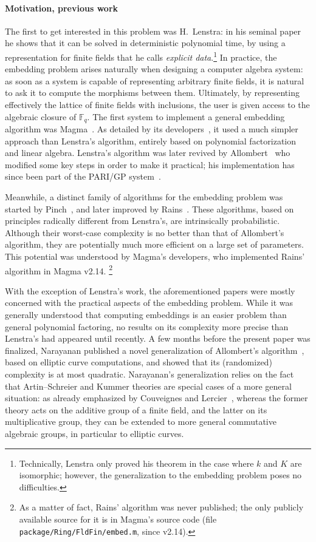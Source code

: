 \documentclass[12pt]{article}
\theoremstyle{plain}
\theoremstyle{definition}
\def\F{\ensuremath{\mathbb{F}}}
\newcounter{algorithm}
\begin{document}
\paragraph{Motivation, previous work}
The first to get interested in this problem was H.~Lenstra: in his
seminal paper~\cite{LenstraJr91} he shows that it can be solved in
deterministic polynomial time, by using a representation for finite
fields that he calls \emph{explicit data}.\footnote{Technically,
  Lenstra only proved his theorem in the case where $k$ and $K$ are
  isomorphic; however, the generalization to the embedding problem
  poses no difficulties.} %
In practice, the embedding problem arises naturally when designing a
computer algebra system: as soon as a system is capable of
representing arbitrary finite fields, it is natural to ask it to
compute the morphisms between them. %
Ultimately, by representing effectively the lattice of finite fields
with inclusions, the user is given access to the algebraic closure of
$\F_q$. %
The first system to implement a general embedding algorithm was
Magma~\cite{MAGMA}. %
As detailed by its developers~\cite{bosma+cannon+steel97}, it used a
much simpler approach than Lenstra's algorithm, entirely based on
polynomial factorization and linear algebra. %
Lenstra's algorithm was later revived by
Allombert~\cite{Allombert02,Allombert02-rev} who modified some key
steps in order to make it practical; his implementation has since been
part of the PARI/GP system~\cite{Pari}.

Meanwhile, a distinct family of algorithms for the embedding problem
was started by Pinch~\cite{Pinch}, and later improved by
Rains~\cite{rains2008}. %
These algorithms, based on principles radically different from
Lenstra's, are intrinsically probabilistic. %
Although their worst-case complexity is no better than that of
Allombert's algorithm, they are potentially much more efficient on a
large set of parameters. %
This potential was understood by Magma's developers, who implemented
Rains' algorithm in Magma v2.14.%
\footnote{As a matter of fact, Rains' algorithm was never published;
  the only publicly available source for it is in Magma's source code
  (file \texttt{package/Ring/FldFin/embed.m}, since v2.14).}

With the exception of Lenstra's work, the aforementioned papers were
mostly concerned with the practical aspects of the embedding
problem. %
While it was generally understood that computing embeddings is an
easier problem than general polynomial factoring, no results on its
complexity more precise than Lenstra's had appeared until recently. %
A few months before the present paper was finalized, Narayanan
published a novel generalization of Allombert's
algorithm~\cite{narayanan2016fast}, based on elliptic curve
computations, and showed that its (randomized) complexity is at most
quadratic.
Narayanan's
  generalization relies on the fact that Artin--Schreier and Kummer
  theories are special cases of a more general situation:
  as already emphasized by Couveignes and Lercier~\cite{CL08}, whereas
  the former theory acts on the additive group of a finite field, and
  the latter on its multiplicative group, they can be extended to more
  general commutative algebraic groups, in particular to elliptic
  curves.
\end{document}
